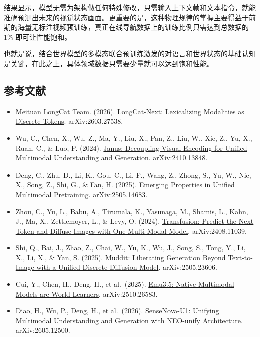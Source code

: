 结果显示，模型无需为架构做任何特殊修改，只需输入上下文帧和文本指令，就能准确预测出未来的视觉状态画面。更重要的是，这种物理规律的掌握主要得益于前期的海量无标注视频预训练，真正在线导航数据上的训练比例只需达到总数据的 1\% 即可让性能饱和。

也就是说，结合世界模型的多模态联合预训练激发的对语言和世界状态的基础认知是关键，在此之上，具体领域数据只需要少量就可以达到饱和性能。

\FloatBarrier
{}
\hypertarget{ux53c2ux8003ux6587ux732e-147}{%
\subsection{参考文献}\label{ux53c2ux8003ux6587ux732e-147}}

\vspace{0.25em}
\begin{itemize}
\tightlist
\item
  Meituan LongCat Team. (2026). \href{https://arxiv.org/abs/2603.27538}{LongCat-Next: Lexicalizing Modalities as Discrete Tokens}. arXiv:2603.27538.
\item
  Wu, C., Chen, X., Wu, Z., Ma, Y., Liu, X., Pan, Z., Liu, W., Xie, Z., Yu, X., Ruan, C., \& Luo, P. (2024). \href{https://arxiv.org/abs/2410.13848}{Janus: Decoupling Visual Encoding for Unified Multimodal Understanding and Generation}. arXiv:2410.13848.
\item
  Deng, C., Zhu, D., Li, K., Gou, C., Li, F., Wang, Z., Zhong, S., Yu, W., Nie, X., Song, Z., Shi, G., \& Fan, H. (2025). \href{https://arxiv.org/abs/2505.14683}{Emerging Properties in Unified Multimodal Pretraining}. arXiv:2505.14683.
\item
  Zhou, C., Yu, L., Babu, A., Tirumala, K., Yasunaga, M., Shamis, L., Kahn, J., Ma, X., Zettlemoyer, L., \& Levy, O. (2024). \href{https://arxiv.org/abs/2408.11039}{Transfusion: Predict the Next Token and Diffuse Images with One Multi-Modal Model}. arXiv:2408.11039.
\item
  Shi, Q., Bai, J., Zhao, Z., Chai, W., Yu, K., Wu, J., Song, S., Tong, Y., Li, X., Li, X., \& Yan, S. (2025). \href{https://arxiv.org/abs/2505.23606}{Muddit: Liberating Generation Beyond Text-to-Image with a Unified Discrete Diffusion Model}. arXiv:2505.23606.
\item
  Cui, Y., Chen, H., Deng, H., et al.~(2025). \href{https://arxiv.org/abs/2510.26583}{Emu3.5: Native Multimodal Models are World Learners}. arXiv:2510.26583.
\item
  Diao, H., Wu, P., Deng, H., et al.~(2026). \href{https://arxiv.org/abs/2605.12500}{SenseNova-U1: Unifying Multimodal Understanding and Generation with NEO-unify Architecture}. arXiv:2605.12500.

\end{itemize}
